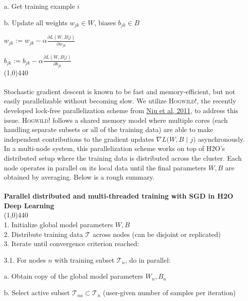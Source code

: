 \hspace{1cm} a. Get training example $i$

\hspace{1cm} b. Update all weights $w_{jk} \in W$, biases $b_{jk} \in B$

\hspace{2cm}  $w_{jk} := w_{jk} - \alpha \frac{\partial L(W,B | j)}{\partial w_{jk}}$

\hspace{2cm} $b_{jk} := b_{jk} - \alpha \frac{\partial L(W,B | j)}{\partial b_{jk}}$
\\
\line(1,0){440}
\\  
\\
Stochastic gradient descent is known to be fast and memory-efficient, but not easily parallelizable without becoming slow. We utilize \textsc{Hogwild!}, the recently developed lock-free parallelization scheme from \href{http://i.stanford.edu/hazy/papers/hogwild-nips.pdf}{Niu et al, 2011}, to address this issue. \textsc{Hogwild!} follows a shared memory model where multiple cores  (each handling separate subsets or all of the training data) are able to make independent contributions to the gradient updates $\nabla L(W,B$ $ |$ $j)$ asynchronously. In a multi-node system, this parallelization scheme works on top of H2O's distributed setup where the training data is distributed across the cluster. Each node operates in parallel on its local data until the final parameters $W,B$ are obtained by averaging. Below is a rough summary.
\\
\\
\noindent
{\bf{\footnotesize{Parallel distributed and multi-threaded training with SGD in H2O Deep Learning}}}
\\
\line(1,0){440}
\\
1. Initialize global model parameters $W,B$
\\
2. Distribute training data $\mathcal{T}$ across nodes (can be disjoint or replicated)
\\
3. Iterate until convergence criterion reached:

\hspace{1cm} 3.1. For nodes $n$ with training subset $\mathcal{T}_n$, do in parallel:

\hspace{2cm}  a. Obtain copy of the global model parameters $W_n, B_n$

\hspace{2cm}  b. Select active subset $\mathcal{T}_{na} \subset \mathcal{T}_n$ (user-given number of samples per iteration)

